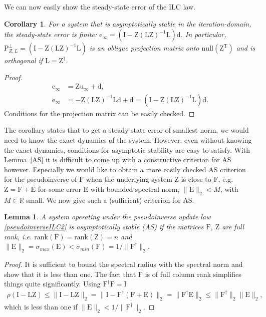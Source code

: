 \documentclass[10pt,a4paper]{article}
\theoremstyle{plain}
\newtheorem{cor}{Corollary}[section]
\newtheorem{lem}{Lemma}
\theoremstyle{definition}
\newcommand{\boldvec}[1]{\boldsymbol{\mathrm{#1}}}
\let\vec\boldvec
\newcommand{\error}{\vec{e}} %
\newcommand{\linDist}{\vec{d}} %
\newcommand{\sysInput}{\vec{u}} %
\newcommand{\latentMat}{\vec{Z}} %
\newcommand{\errorMat}{\vec{E}} %
\newcommand{\lmatrix}{\vec{L}} %
\newcommand{\systemMat}{\vec{F}} %
\newcommand{\projOblique}{\vec{P}_{Z,L}^{\perp}} %
\begin{document}
%
We can now easily show the steady-state error of the ILC law.
%
\begin{cor}
For a system that is asymptotically stable in the iteration-domain, the steady-state error is finite: $\error_{\infty} = (\vec{I} - \latentMat(\lmatrix\latentMat)^{-1}\lmatrix)\linDist$. In particular, $\projOblique = (\vec{I} - \latentMat(\lmatrix\latentMat)^{-1}\lmatrix)$ is an oblique projection matrix onto $\mathrm{null}(\latentMat^{\mathrm{T}})$ and is orthogonal if $\lmatrix = \latentMat^{\dagger}$.
\end{cor}
%
\begin{proof}
%
\begin{align}
\error_{\infty} &= \latentMat\sysInput_{\infty} + \linDist, \\
\error_{\infty} &= -\latentMat(\lmatrix\latentMat)^{-1}\lmatrix\linDist + \linDist = (\vec{I} - \latentMat(\lmatrix\latentMat)^{-1}\lmatrix)\linDist.
\end{align}
%
Conditions for the projection matrix can be easily checked.
\end{proof}
%
The corollary states that to get a steady-state error of smallest norm, we would need to know the exact dynamics of the system. However, even without knowing the exact dynamics, conditions for asymptotic stability are easy to satisfy. %
With Lemma~\ref{AS} it is difficult to come up with a constructive criterion for AS however. Especially we would like to obtain a more easily checked AS criterion for the pseudoinverse of $\systemMat$ when the underlying system $\latentMat$ is close to $\systemMat$, e.g. $\latentMat = \systemMat + \errorMat$ for some error $\errorMat$ with bounded spectral norm, $\|\errorMat\|_2 < M$, with $M \in \mathbb{R}$ small. We now give such a (sufficient) criterion for AS.
%
\begin{lem}
A system operating under the pseudoinverse update law \eqref{pseudoinverseILC2} is asymptotically stable (AS) if the matrices $\systemMat$, $\latentMat$ are full rank, i.e. $\mathrm{rank}(\systemMat) = \mathrm{rank}(\latentMat) = n$ and $\|\errorMat\|_2 = \sigma_{max}(\errorMat) < \sigma_{min}(\systemMat) = 1/\|\systemMat^{\dagger}\|_2$.
\end{lem}
%
\begin{proof}
It is sufficient to bound the spectral radius with the spectral norm and show that it is less than one. The fact that $\systemMat$ is of full column rank simplifies things quite significantly. Using $\systemMat^{\dagger}\systemMat = \vec{I}$
%
\begin{align}
\rho(\vec{I} - \lmatrix\latentMat) \leq \|\vec{I} - \lmatrix\latentMat\|_2 = \|\vec{I} - \systemMat^{\dagger}(\systemMat + \errorMat)\|_2 =  \|\systemMat^{\dagger}\errorMat\|_2 \leq \|\systemMat^{\dagger}\|_2\|\errorMat\|_2,
\end{align}
%
which is less than one if $\|\errorMat\|_2 < 1/\|\systemMat^{\dagger}\|_2$.
\end{proof}
\end{document}

